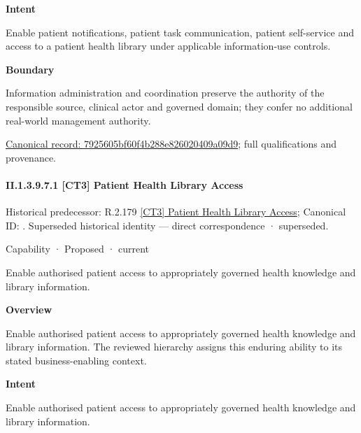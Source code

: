 \textbf{Intent}



Enable patient notifications, patient task communication, patient self-service and access to a patient health library under applicable information-use controls.



\textbf{Boundary}



Information administration and coordination preserve the authority of the responsible source, clinical actor and governed domain; they confer no additional real-world management authority.


{\footnotesize \href{../../../../continuum/strategy/capability/7925605bf60f4b288e826020409a09d9.md}{Canonical record: 7925605bf60f4b288e826020409a09d9}; full qualifications and provenance.}\par
\paragraph*{II.1.3.9.7.1 [CT3] Patient Health Library Access}
\label{navigation:II.1.3.9.7.1}

{\small Historical predecessor: R.2.179 \hyperref[element:b132224cfa6f435f8f2a66a3878d6df6]{[CT3] Patient Health Library Access}; Canonical ID: \texttt{}. Superseded historical identity — direct correspondence · superseded.}\par
\label{element:808e5a3c3f6b496fa329962088f0bee0}
{\small Capability · Proposed · current}\par

Enable authorised patient access to appropriately governed health knowledge and library information.



\textbf{Overview}



Enable authorised patient access to appropriately governed health knowledge and library information. The reviewed hierarchy assigns this enduring ability to its stated business-enabling context.



\textbf{Intent}



Enable authorised patient access to appropriately governed health knowledge and library information.



